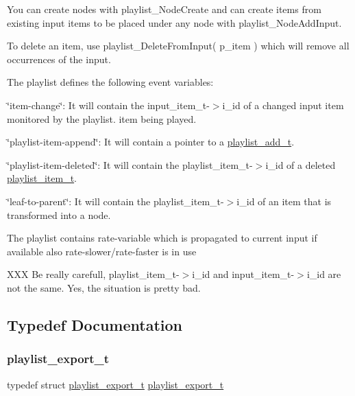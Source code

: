 You can create nodes with playlist\+\_\+\+Node\+Create and can create items from existing input items to be placed under any node with playlist\+\_\+\+Node\+Add\+Input.

To delete an item, use playlist\+\_\+\+Delete\+From\+Input( p\+\_\+item ) which will remove all occurrences of the input.

The playlist defines the following event variables\+:


\begin{DoxyItemize}
\item \char`\"{}item-\/change\char`\"{}\+: It will contain the input\+\_\+item\+\_\+t-\/$>$i\+\_\+id of a changed input item monitored by the playlist. item being played.
\item \char`\"{}playlist-\/item-\/append\char`\"{}\+: It will contain a pointer to a \hyperlink{structplaylist__add__t}{playlist\+\_\+add\+\_\+t}.
\item \char`\"{}playlist-\/item-\/deleted\char`\"{}\+: It will contain the playlist\+\_\+item\+\_\+t-\/$>$i\+\_\+id of a deleted \hyperlink{structplaylist__item__t}{playlist\+\_\+item\+\_\+t}.
\item \char`\"{}leaf-\/to-\/parent\char`\"{}\+: It will contain the playlist\+\_\+item\+\_\+t-\/$>$i\+\_\+id of an item that is transformed into a node.
\end{DoxyItemize}

The playlist contains rate-\/variable which is propagated to current input if available also rate-\/slower/rate-\/faster is in use

X\+XX Be really carefull, playlist\+\_\+item\+\_\+t-\/$>$i\+\_\+id and input\+\_\+item\+\_\+t-\/$>$i\+\_\+id are not the same. Yes, the situation is pretty bad. 

\subsection{Typedef Documentation}
\mbox{\label{group__vlc__playlist_ga6b0ee051ff356a72cbf0f35bf3089938}} 
\subsubsection{\texorpdfstring{playlist\+\_\+export\+\_\+t}{playlist\_export\_t}}
{\footnotesize\ttfamily typedef struct \hyperlink{structplaylist__export__t}{playlist\+\_\+export\+\_\+t}  \hyperlink{structplaylist__export__t}{playlist\+\_\+export\+\_\+t}}

